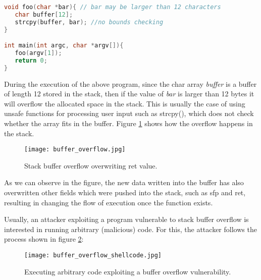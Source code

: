 \begin{lstlisting}[language=C, caption={Program vulnerable to buffer overflow.}, label={code:vuln_overflow}]
void foo(char *bar){ // bar may be larger than 12 characters
   char buffer[12];
   strcpy(buffer, bar); //no bounds checking 
}

int main(int argc, char *argv[]){
   foo(argv[1]);
   return 0;
}
\end{lstlisting}

During the execution of the above program, since the char array \textit{buffer} is a buffer of length 12 stored in the stack, then if the value of \textit{bar} is larger than 12 bytes it will overflow the allocated space in the stack. This is usually the case of using unsafe functions for processing user input such as strcpy(), which does not check whether the array fits in the buffer. Figure \ref{fig:buffer_overflow} shows how the overflow happens in the stack.

\begin{figure}[htbp]
	\centering
	\texttt{[image: buffer\_overflow.jpg]}
	\caption{Stack buffer overflow overwriting ret value.}
	\label{fig:buffer_overflow}
\end{figure}

As we can observe in the figure, the new data written into the buffer has also overwritten other fields which were pushed into the stack, such as sfp and ret, resulting in changing the flow of execution once the function exists.

Usually, an attacker exploiting a program vulnerable to stack buffer overflow is interested in running arbitrary (malicious) code. For this, the attacker follows the process shown in figure \ref{fig:buffer_overflow_shellcode}:

\begin{figure}[htbp]
	\centering
	\texttt{[image: buffer\_overflow\_shellcode.jpg]}
	\caption{Executing arbitrary code exploiting a buffer overflow vulnerability.}
	\label{fig:buffer_overflow_shellcode}
\end{figure}

